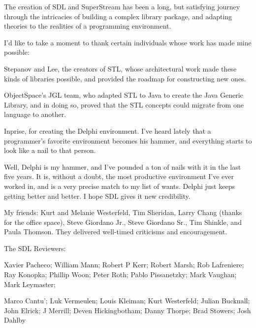 \documentclass{report}
\begin{document}
The creation of SDL and SuperStream has been a long, but satisfying journey
through the intricacies of building a complex library package, and adapting
theories to the realities of a programming environment.

I'd like to take a moment to thank certain individuals whose 
work has made mine possible:

Stepanov and Lee, the creators of STL, whose architectural work made these
kinds of libraries possible, and provided the roadmap for constructing new
ones.

ObjectSpace's JGL team, who adapted STL to Java to create the Java Generic
Library, and in doing so, proved that the STL concepts could migrate from
one language to another.

Inprise, for creating the Delphi environment. I've heard lately that a
programmer's favorite environment becomes his hammer, and everything starts
to look like a nail to that person.

Well, Delphi is my hammer, and I've pounded a ton of nails with it in the
last five years. It is, without a doubt, the most productive environment
I've ever worked in, and is a very precise match to my list of wants. Delphi
just keeps getting better and better. I hope SDL gives it new credibility.

My friends: Kurt and Melanie Westerfeld, Tim Sheridan, Larry Chang (thanks
for the office space), Steve Giordano Jr., Steve Giordano Sr., Tim Shinkle,
and Paula Thomson. They delivered well-timed criticisms and encouragement.

The SDL Reviewers:

Xavier Pacheco; William Mann; Robert P Kerr; Robert Marsh; Rob Lafreniere;
Ray Konopka; Phillip Woon; Peter Roth; Pablo Pissanetzky; Mark Vaughan; Mark
Leymaster;

Marco Cantu'; Luk Vermeulen; Louis Kleiman; Kurt Westerfeld; Julian
Bucknall; John Elrick; J Merrill; Deven Hickingbotham; Danny Thorpe; Brad
Stowers; Josh Dahlby
\end{document}
